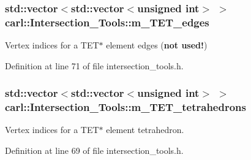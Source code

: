\hypertarget{classcarl_1_1_intersection___tools_a153baf989b64fb7033e42ba2342e0fc5}{}
\subsubsection[{m\+\_\+\+T\+E\+T\+\_\+edges}]{\setlength{\rightskip}{0pt plus 5cm}std\+::vector$<$std\+::vector$<$unsigned int$>$ $>$ carl\+::\+Intersection\+\_\+\+Tools\+::m\+\_\+\+T\+E\+T\+\_\+edges\hspace{0.3cm}{\ttfamily [protected]}}\label{classcarl_1_1_intersection___tools_a153baf989b64fb7033e42ba2342e0fc5}


Vertex indices for a T\+E\+T$\ast$ element edges ({\bfseries not used!}) 



Definition at line 71 of file intersection\+\_\+tools.\+h.

\hypertarget{classcarl_1_1_intersection___tools_a6e9a49f3b382810c884ba46b791bfcb8}{}
\subsubsection[{m\+\_\+\+T\+E\+T\+\_\+tetrahedrons}]{\setlength{\rightskip}{0pt plus 5cm}std\+::vector$<$std\+::vector$<$unsigned int$>$ $>$ carl\+::\+Intersection\+\_\+\+Tools\+::m\+\_\+\+T\+E\+T\+\_\+tetrahedrons\hspace{0.3cm}{\ttfamily [protected]}}\label{classcarl_1_1_intersection___tools_a6e9a49f3b382810c884ba46b791bfcb8}


Vertex indices for a T\+E\+T$\ast$ element tetrahedron. 



Definition at line 69 of file intersection\+\_\+tools.\+h.

\hypertarget{classcarl_1_1_intersection___tools_a54e026b256ab6894b1f77950a425b1eb}{}
